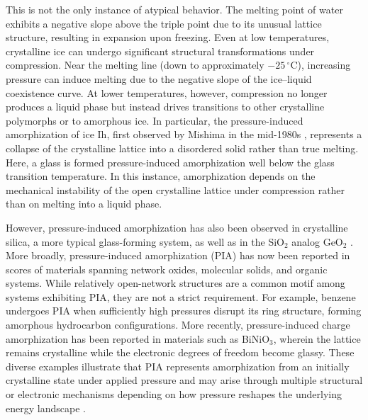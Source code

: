 This is not the only instance of atypical behavior. The melting point of water exhibits a negative slope above the triple point due to its unusual lattice structure, resulting in expansion upon freezing. Even at low temperatures, crystalline ice can undergo significant structural transformations under compression. Near the melting line (down to approximately $-25\,^{\circ}\mathrm{C}$), increasing pressure can induce melting due to the negative slope of the ice--liquid coexistence curve. At lower temperatures, however, compression no longer produces a liquid phase but instead drives transitions to other crystalline polymorphs or to amorphous ice. In particular, the pressure-induced amorphization of ice Ih, first observed by Mishima \etal in the mid-1980s \cite{Mishima}, represents a collapse of the crystalline lattice into a disordered solid rather than true melting. Here, a glass is formed \via pressure-induced amorphization well below the glass transition temperature. In this instance, amorphization depends on the mechanical instability of the open crystalline lattice under compression rather than on melting into a liquid phase.

However, pressure-induced amorphization has also been observed in crystalline silica, a more typical glass-forming system, as well as in the SiO$_2$ analog GeO$_2$ \nolinebreak \cite{Hemley,Wolf}. More broadly, pressure-induced amorphization (PIA) has now been reported in scores of materials spanning network oxides, molecular solids, and organic systems. While relatively open-network structures are a common motif among systems exhibiting PIA, they are not a strict requirement. For example, benzene undergoes PIA when sufficiently high pressures disrupt its ring structure, forming amorphous hydrocarbon configurations. More recently, pressure-induced charge amorphization has been reported in materials such as BiNiO$_3$, wherein the lattice remains crystalline while the electronic degrees of freedom become glassy. These diverse examples illustrate that PIA represents amorphization from an initially crystalline state under applied pressure and may arise through multiple structural or electronic mechanisms depending on how pressure reshapes the underlying energy landscape \nolinebreak \cite{Ponyatovsky}.  


